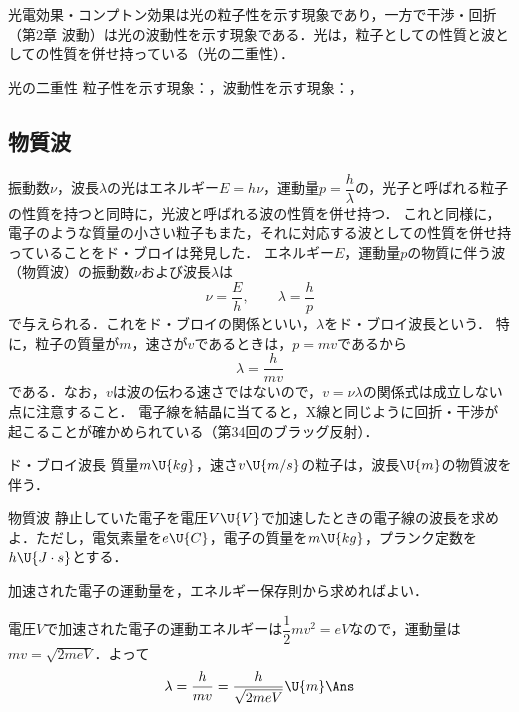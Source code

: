 光電効果・コンプトン効果は光の{\gtfamily 粒子性}を示す現象であり，一方で干渉・回折（第2章 波動）は光の{\gtfamily 波動性}を示す現象である．光は，粒子としての性質と波としての性質を併せ持っている（{\gtfamily 光の二重性}）．

\bsNeed{26mm}
\begin{matome}{光の二重性}
 \hspace{3mm} 粒子性を示す現象：，\qquad 波動性を示す現象：，
\end{matome}

\subsection{物質波}

振動数$\nu$，波長$\lambda$の光はエネルギー$E=h\nu$，運動量$p=\dfrac{h}{\lambda}$の，光子と呼ばれる粒子の性質を持つと同時に，光波と呼ばれる波の性質を併せ持つ．
これと同様に，電子のような質量の小さい粒子もまた，それに対応する波としての性質を併せ持っていることをド・ブロイは発見した．
エネルギー$E$，運動量$p$の物質に伴う波（{\gtfamily 物質波}）の振動数$\nu$および波長$\lambda$は
\[\nu=\frac{E}{h},\qquad\lambda=\frac{h}{p}\]
で与えられる．これを{\gtfamily ド・ブロイの関係}といい，$\lambda$を{\gtfamily ド・ブロイ波長}という．
特に，粒子の質量が$m$，速さが$v$であるときは，$p=mv$であるから
\[\lambda=\frac{h}{mv}\]
である．なお，$v$は波の伝わる速さではないので，$v=\nu\lambda$の関係式は成立しない点に注意すること．
電子線を結晶に当てると，X線と同じように回折・干渉が起こることが確かめられている（第34回のブラッグ反射）．

\bsNeed{20mm}
\begin{matome}{ド・ブロイ波長}
 \hspace{3mm} 質量$m\U{kg}$，速さ$v\U{m/s}$の粒子は，波長$\U{m}$の物質波を伴う．
\end{matome}

\bsNeed{40mm}
\begin{reidaiunit}
\begin{reidai}{物質波}
\hspace{1zw}静止していた電子を電圧$V\U{V}$で加速したときの電子線の波長を求めよ．ただし，電気素量を$e\U{C}$，電子の質量を$m\U{kg}$，プランク定数を$h\U{J\cdot s}$とする．
\end{reidai}

\begin{sisinE}
加速された電子の運動量を，エネルギー保存則から求めればよい．
\end{sisinE}


\begin{kaitou}
電圧$V$で加速された電子の運動エネルギーは$\dfrac{1}{2}mv^2=eV$なので，運動量は$mv=\sqrt{2meV}$．よって
\[\lambda=\frac{h}{mv}=\frac{h}{\sqrt{2meV}}\U{m}\Ans\]
\end{kaitou}
\end{reidaiunit}

